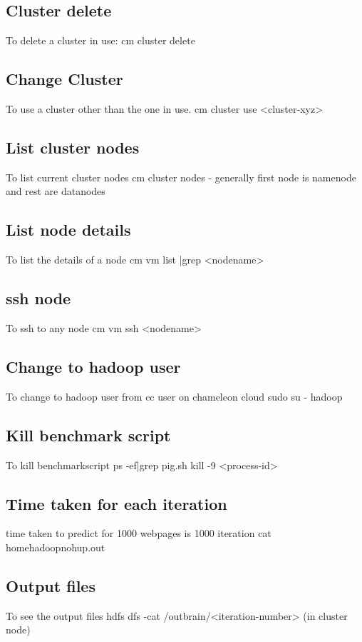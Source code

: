 \documentclass[9pt,twocolumn,twoside]{../../styles/osajnl}
\begin{document}
\subsection{Cluster delete} To delete a cluster in use:
\newline cm cluster delete
\subsection{Change Cluster} To use a cluster other than the one in use.
\newline cm cluster use <cluster-xyz>
\subsection{List cluster nodes} To list current cluster nodes
\newline cm cluster nodes - generally first node is namenode and rest are datanodes
\subsection{List node details} To list the details of a node
\newline cm vm list |grep <nodename>
\subsection{ssh node} To ssh to any node
\newline cm vm ssh <nodename>
\subsection{Change to hadoop user} To change to hadoop user from cc user on chameleon cloud
\newline sudo su - hadoop
\subsection{Kill benchmark script} To kill benchmarkscript
\newline ps -ef|grep pig.sh
\newline kill -9 <process-id> 
\subsection{Time taken for each iteration} time taken to predict for 1000 webpages is 1000 iteration
\newline cat \/home\/hadoop\/nohup.out
\subsection{Output files} To see the output files
\newline hdfs dfs -cat /outbrain/<iteration-number> (in cluster node)
\end{document}
